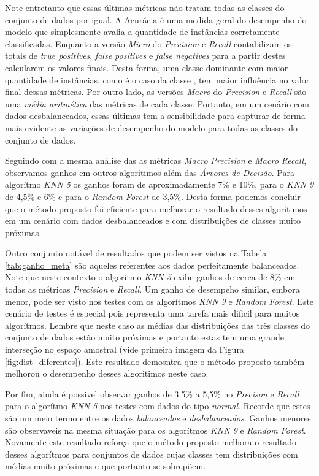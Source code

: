 Note entretanto que essas últimas métricas não tratam todas as classes do conjunto de dados por igual.
A Acurácia é uma medida geral do desempenho do modelo que simplesmente avalia a quantidade de instâncias corretamente classificadas.
Enquanto a versão \textit{Micro} do \textit{Precision} e \textit{Recall} contabilizam os totais de \textit{true positives}, \textit{false positives} e \textit{false negatives} para a partir destes calcularem os valores finais.
Desta forma, uma classe dominante com maior quantidade de instâncias, como é o caso da classe , tem maior influência no valor final dessas métricas.
Por outro lado, as versões \textit{Macro} do \textit{Precision} e \textit{Recall} são uma \textit{média aritmética} das métricas de cada classe.
Portanto, em um cenário com dados desbalanceados, essas últimas tem a sensibilidade para capturar de forma mais evidente as variações de desempenho do modelo para todas as classes do conjunto de dados.

Seguindo com a mesma análise das as métricas \textit{Macro Precision} e \textit{Macro Recall}, observamos ganhos em outros algorítimos além das \textit{Árvores de Decisão}.
Para algorítmo \textit{KNN 5} os ganhos foram de aproximadamente 7\% e 10\%, para o \textit{KNN 9} de 4,5\% e 6\% e para o \textit{Random Forest} de 3,5\%.
Desta forma podemos concluir que o método proposto foi eficiente para melhorar o resultado desses algorítimos em um cenário com dados desbalanceados e com distribuições de classes muito próximas.

Outro conjunto notável de resultados que podem ser vistos na Tabela \ref{tab:ganho_meta} são aqueles referentes aos dados perfeitamente balanceados.
Note que neste contexto o algorítmo \textit{KNN 5} exibe ganhos de cerca de 8\% em todas as métricas \textit{Precision} e \textit{Recall}.
Um ganho de desempeho similar, embora menor, pode ser visto nos testes com os algorítmos \textit{KNN 9} e \textit{Random Forest}.
Este cenário de testes é especial pois representa uma tarefa mais dificil para muitos algorítmos.
Lembre que neste caso as médias das distribuições das três classes do conjunto de dados estão muito próximas e portanto estas tem uma grande interseção no espaço amostral (vide primeira imagem da Figura \ref{fig:dist_diferentes}).
Este resultado demosntra que o método proposto também melhorou o desempenho desses algoritimos neste caso.

Por fim, ainda é possivel observar ganhos de 3,5\% a 5,5\% no \textit{Precison} e \textit{Recall} para o algorítmo \textit{KNN 5} nos testes com dados do tipo \textit{normal}.
Recorde que estes são um meio termo entre os dados \textit{balanceados} e \textit{desbalanceados}.
Ganhos menores são observaveis na mesma situação para os algorítmos \textit{KNN 9} e \textit{Random Forest}.
Novamente este resultado reforça que o método proposto melhora o resultado desses algorítmos para conjuntos de dados cujas classes tem distribuições com médias muito próximas e que portanto se sobrepõem.

